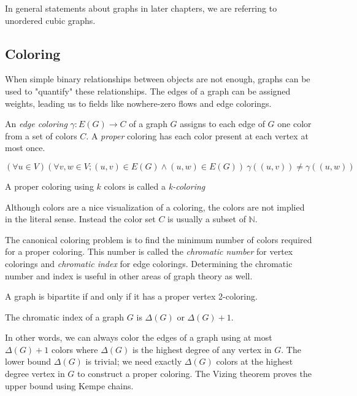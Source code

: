 In general statements about graphs in later chapters, we are referring to unordered cubic graphs.

\subsection{Coloring}

When simple binary relationships between objects are not enough, graphs can be used to "quantify" these relationships. The edges of a graph can be assigned weights, leading us to fields like nowhere-zero flows and edge colorings.

\begin{definition}
    An \textit{edge coloring} $\gamma : E(G) \rightarrow C$ of a graph $G$ assigns to each edge of $G$ one color from a set of colors $C$. A \textit{proper} coloring has each color present at each vertex at most once.

    $$(\forall u \in V)(\forall v,w \in V; (u,v) \in E(G) \land (u,w) \in E(G)) ~ \gamma((u,v)) \neq \gamma((u,w))$$

    A proper coloring using $k$ colors is called a \textit{k-coloring}
\end{definition}

Although colors are a nice visualization of a coloring, the colors are not implied in the literal sense. Instead the color set $C$ is usually a subset of $\mathbb{N}$.

The canonical coloring problem is to find the minimum number of colors required for a proper coloring. This number is called the \textit{chromatic number} for vertex colorings and \textit{chromatic index} for edge colorings. Determining the chromatic number and index is useful in other areas of graph theory as well.

\begin{theorem}\label{th:bipartite}
    A graph is bipartite if and only if it has a proper vertex 2-coloring.
\end{theorem}

\begin{theorem}[Vizing]
    The chromatic index of a graph $G$ is $\Delta(G)$ or $\Delta(G) + 1$.
\end{theorem}

In other words, we can always color the edges of a graph using at most $\Delta(G) + 1$ colors where $\Delta(G)$ is the highest degree of any vertex in $G$. The lower bound $\Delta(G)$ is trivial; we need exactly $\Delta(G)$ colors at the highest degree vertex in $G$ to construct a proper coloring. The Vizing theorem proves the upper bound using Kempe chains.

